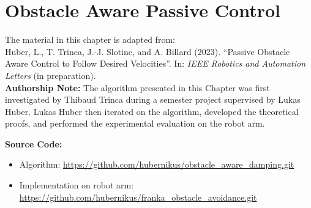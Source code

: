 \chapter{Obstacle Aware Passive Control} \label{chap:passivity_aware_damping}
% 
% 
\begin{publicationbox}
	The material in this chapter is adapted from: \\
	Huber, L., T. Trinca, J.-J. Slotine, and A. Billard (2023). “Passive Obstacle Aware Control to Follow Desired Velocities”. In: \textit{IEEE Robotics and Automation Letters} (in preparation). \\

\textbf{Authorship Note:}
 The algorithm presented in this Chapter was first investigated by Thibaud Trinca during a semester project supervised by Lukas Huber.
 Lukas Huber then iterated on the algorithm, developed the theoretical proofs, and performed the experimental evaluation on the robot arm.

\textbf{Source Code:}
\begin{itemize}
	\setlength\itemsep{-0.0em}
\item Algorithm:
	\url{https://github.com/hubernikus/obstacle_aware_damping.git}
\item Implementation on robot arm: \\
	\url{https://github.com/hubernikus/franka_obstacle_avoidance.git} 
\end{itemize}


\end{publicationbox}

